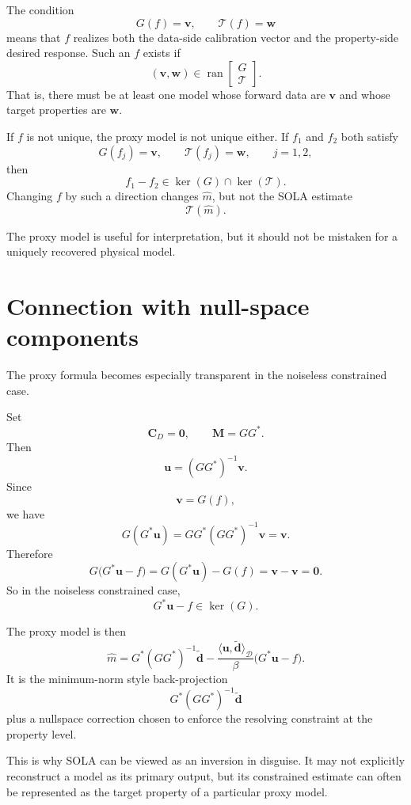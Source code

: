 \documentclass[11pt,openany]{book}
\theoremstyle{definition}
\theoremstyle{remark}
\newcommand{\D}{\mathcal D}
\newcommand{\Tau}{\mathcal{T}}
\newcommand{\range}{\operatorname{ran}}
\newcommand{\kernel}{\operatorname{ker}}
\begin{document}
The condition
\[
  G(f)=\mathbf v,
  \qquad
  \Tau(f)=\mathbf w
\]
means that \(f\) realizes both the data-side calibration vector and the property-side desired
response. Such an \(f\) exists if
\[
  (\mathbf v,\mathbf w)
  \in
  \range
  \begin{bmatrix}
    G\\
    \Tau
  \end{bmatrix}.
\]
That is, there must be at least one model whose forward data are \(\mathbf v\) and whose target
properties are \(\mathbf w\).

If \(f\) is not unique, the proxy model is not unique either. If \(f_1\) and \(f_2\) both satisfy
\[
  G(f_j)=\mathbf v,
  \qquad
  \Tau(f_j)=\mathbf w,
  \qquad j=1,2,
\]
then
\[
  f_1-f_2\in\kernel(G)\cap\kernel(\Tau).
\]
Changing \(f\) by such a direction changes \(\hat m\), but not the SOLA estimate
\[
  \Tau(\hat m).
\]

\begin{lessonbox}
The proxy model is useful for interpretation, but it should not be mistaken for a uniquely
recovered physical model.
\end{lessonbox}

\section{Connection with null-space components}

The proxy formula becomes especially transparent in the noiseless constrained case.

Set
\[
  \mathbf C_D=\mathbf 0,
  \qquad
  \mathbf M=GG^*.
\]
Then
\[
  \mathbf u=(GG^*)^{-1}\mathbf v.
\]
Since
\[
  \mathbf v=G(f),
\]
we have
\[
  G(G^*\mathbf u)
  =
  GG^*(GG^*)^{-1}\mathbf v
  =
  \mathbf v.
\]
Therefore
\[
  G\bigl(G^*\mathbf u-f\bigr)
  =
  G(G^*\mathbf u)-G(f)
  =
  \mathbf v-\mathbf v
  =
  \mathbf 0.
\]
So in the noiseless constrained case,
\[
  G^*\mathbf u-f\in\kernel(G).
\]

The proxy model is then
\[
  \hat m
  =
  G^*(GG^*)^{-1}\widetilde{\mathbf d}
  -
  \frac{\langle \mathbf u,\widetilde{\mathbf d}\rangle_{\D}}{\beta}
  \bigl(G^*\mathbf u-f\bigr).
\]
It is the minimum-norm style back-projection
\[
  G^*(GG^*)^{-1}\widetilde{\mathbf d}
\]
plus a nullspace correction chosen to enforce the resolving constraint at the property level.

This is why SOLA can be viewed as an inversion in disguise. It may not explicitly reconstruct a
model as its primary output, but its constrained estimate can often be represented as the target
property of a particular proxy model.
\end{document}
